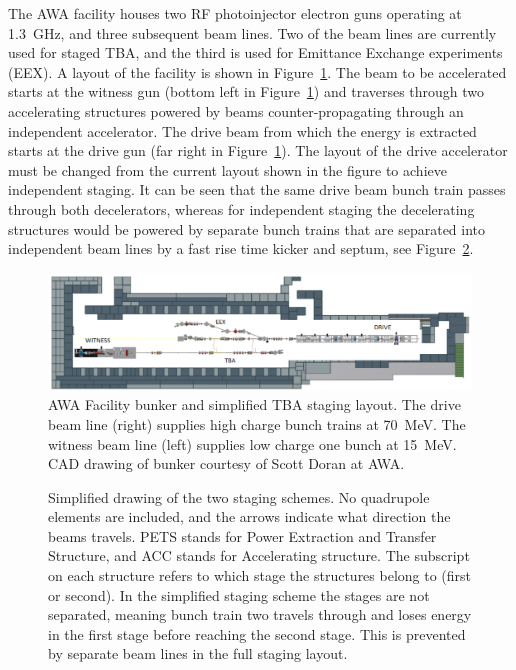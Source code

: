 The AWA facility houses two RF photoinjector electron guns operating
at \SI{1.3}{GHz}, and three subsequent beam lines. 
Two of the beam lines are currently used for staged TBA, and the
third is used for Emittance Exchange experiments (EEX). A layout of
the facility is shown in Figure~\ref{fig:bunker}.  
The beam to be accelerated starts at the witness gun (bottom left in Figure~\ref{fig:bunker}) 
and traverses through two accelerating structures powered by beams counter-propagating through 
an independent accelerator. The drive beam from which the energy is extracted starts at the drive gun (far right in Figure~\ref{fig:bunker}).
The layout of the drive accelerator must be changed from the current layout shown in the figure to achieve independent staging.  
It can be seen that the same drive beam bunch train passes through both decelerators, 
whereas for independent staging the decelerating structures would be powered by separate bunch trains
that are separated into independent beam lines by a fast rise time kicker and septum, see Figure~\ref{fig:singlestage}. 
\begin{figure}
	\begin{center}
		\includegraphics[width=\linewidth]{./images/bunker}
	\end{center}
	\caption{AWA Facility bunker and simplified TBA staging layout. 
		The drive beam line (right) supplies high charge bunch trains at \SI{70}{MeV}.
		The witness beam line (left) supplies low charge one bunch at \SI{15}{MeV}. 
		CAD drawing of bunker courtesy of Scott Doran at AWA.}
	\label{fig:bunker}
\end{figure}
\begin{figure}
	\begin{center}
		\begin{tikzpicture}[scale=\textwidth/35cm, text=black]
		
		\end{tikzpicture}
	\end{center}
	\caption{Simplified drawing of the two staging schemes.
		No quadrupole elements are included, and the arrows indicate what direction the beams travels.
		PETS stands for Power Extraction and Transfer Structure, and ACC stands for Accelerating structure. 
		The subscript on each structure refers to which stage the structures belong to (first or second). 
		In the simplified staging scheme the stages are not separated, meaning bunch train two travels
		through and loses energy in the first stage before reaching the second stage.
		This is prevented by separate beam lines in the full staging layout. }
	\label{fig:singlestage}
\end{figure}

